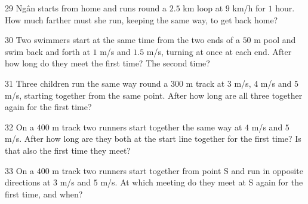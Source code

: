 \gap
\begin{probbox}{29}{\relax}
Ngân starts from home and runs round a $2.5$ km loop at $9$ km/h for $1$ hour. How much farther must she run, keeping the same way, to get back home?
\end{probbox}
\gap
\begin{probbox}{30}{\relax}
Two swimmers start at the same time from the two ends of a $50$ m pool and swim back and forth at $1$ m/s and $1.5$ m/s, turning at once at each end. After how long do they meet the first time? The second time?
\end{probbox}
\begin{probbox}{31}{}
Three children run the same way round a $300$ m track at $3$ m/s, $4$ m/s and $5$ m/s, starting together from the same point. After how long are all three together again for the first time?
\end{probbox}
\gap
\begin{probbox}{32}{}
On a $400$ m track two runners start together the same way at $4$ m/s and $5$ m/s. After how long are they both at the start line together for the first time? Is that also the first time they meet?
\end{probbox}
\gap
\begin{probbox}{33}{}
On a $400$ m track two runners start together from point S and run in opposite directions at $3$ m/s and $5$ m/s. At which meeting do they meet at S again for the first time, and when?
\end{probbox}
